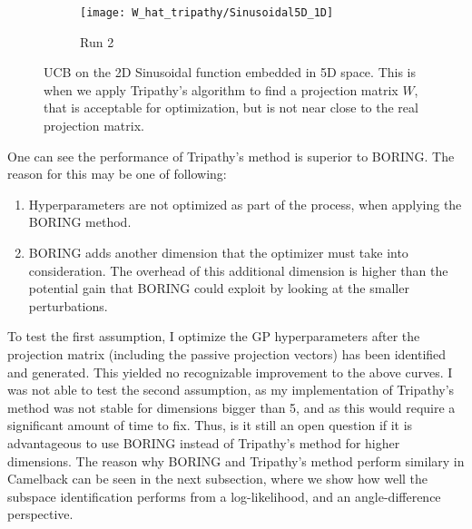 \begin{figure}[H]
	\centering
    \begin{subfigure}[b]{0.5\textwidth}
        \texttt{[image: W\_hat\_tripathy/Sinusoidal5D\_1D]}
        \label{fig:tiger}
        \caption{Run 2}
    \end{subfigure}   
           \caption{UCB on the 2D Sinusoidal function embedded in 5D space.
  This is when we apply Tripathy's algorithm to find a projection matrix $W$, that is acceptable for optimization, but is not near close to the real projection matrix.}
\end{figure}

One can see the performance of Tripathy's method is superior to BORING.
The reason for this may be one of following:

\begin{enumerate}
\item Hyperparameters are not optimized as part of the process, when applying the BORING method.
\item BORING adds another dimension that the optimizer must take into consideration.
The overhead of this additional dimension is higher than the potential gain that BORING could exploit by looking at the smaller perturbations.
\end{enumerate}

To test the first assumption, I optimize the GP hyperparameters after the projection matrix (including the passive projection vectors) has been identified and generated.
This yielded no recognizable improvement to the above curves.
I was not able to test the second assumption, as my implementation of Tripathy's method was not stable for dimensions bigger than 5, and as this would require a significant amount of time to fix.
Thus, is it still an open question if it is advantageous to use BORING instead of Tripathy's method for higher dimensions.
The reason why BORING and Tripathy's method perform similary in Camelback can be seen in the next subsection, where we show how well the subspace identification performs from a log-likelihood, and an angle-difference perspective.


